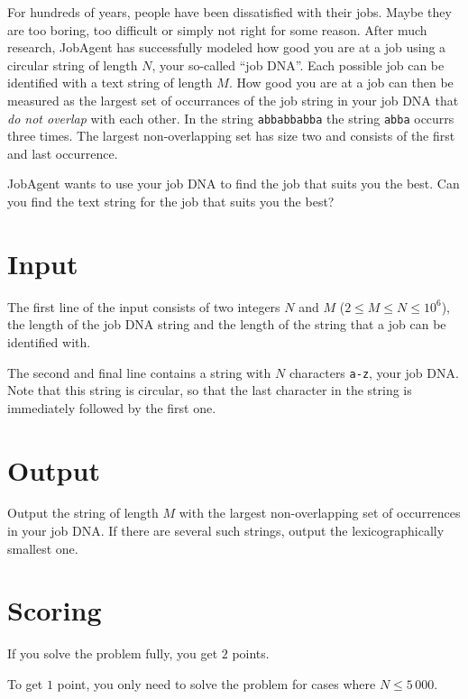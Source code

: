 For hundreds of years, people have been dissatisfied with their jobs.
Maybe they are too boring, too difficult or simply not right for some reason.
After much research, JobAgent has successfully modeled how good you are at a job using a circular string of length $N$, your so-called ``job DNA''.
Each possible job can be identified with a text string of length $M$.
How good you are at a job can then be measured as the largest set of occurrances of the job string in your job DNA that \emph{do not overlap} with each other.
In the string \texttt{abbabbabba} the string \texttt{abba} occurrs three times.
The largest non-overlapping set has size two and consists of the first and last occurrence.

JobAgent wants to use your job DNA to find the job that suits you the best.
Can you find the text string for the job that suits you the best?

\section*{Input}
The first line of the input consists of two integers $N$ and $M$ ($2 \le M \le N \le 10^6$), the length of the job DNA string and the length of the string that a job can be identified with.

The second and final line contains a string with $N$ characters \texttt{a-z}, your job DNA.
Note that this string is circular, so that the last character in the string is immediately followed by the first one.

\section*{Output}
Output the string of length $M$ with the largest non-overlapping set of occurrences in your job DNA.
If there are several such strings, output the lexicographically smallest one.

\section*{Scoring}
If you solve the problem fully, you get $2$ points.

To get $1$ point, you only need to solve the problem for cases where $N \le 5\,000$.
